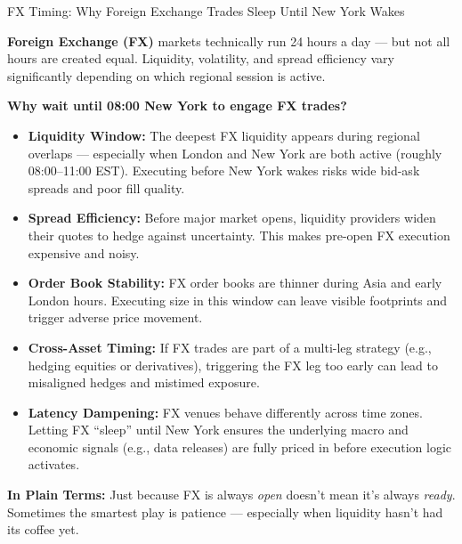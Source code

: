 \medskip
\begin{TechnicalSidebar}{FX Timing: Why Foreign Exchange Trades Sleep Until New York Wakes}

    \textbf{Foreign Exchange (FX)} markets technically run 24 hours a day — but not all hours are created equal.  
    Liquidity, volatility, and spread efficiency vary significantly depending on which regional session is active.
    
    \medskip
    
    \textbf{Why wait until 08:00 New York to engage FX trades?}

    \medskip
    
    \begin{itemize}
      \item \textbf{Liquidity Window:}  
      The deepest FX liquidity appears during regional overlaps — especially when London and New York are both active (roughly 08:00–11:00 EST).  
      Executing before New York wakes risks wide bid-ask spreads and poor fill quality.
    
      \item \textbf{Spread Efficiency:}  
      Before major market opens, liquidity providers widen their quotes to hedge against uncertainty.  
      This makes pre-open FX execution expensive and noisy.
    
      \item \textbf{Order Book Stability:}  
      FX order books are thinner during Asia and early London hours.  
      Executing size in this window can leave visible footprints and trigger adverse price movement.
    
      \item \textbf{Cross-Asset Timing:}  
      If FX trades are part of a multi-leg strategy (e.g., hedging equities or derivatives), triggering the FX leg too early can lead to misaligned hedges and mistimed exposure.
    
      \item \textbf{Latency Dampening:}  
      FX venues behave differently across time zones.  
      Letting FX “sleep” until New York ensures the underlying macro and economic signals (e.g., data releases) are fully priced in before execution logic activates.
    \end{itemize}
    
    \medskip
    
    \textbf{In Plain Terms:}  
    Just because FX is always \textit{open} doesn’t mean it’s always \textit{ready}.  
    Sometimes the smartest play is patience — especially when liquidity hasn’t had its coffee yet.
    
\end{TechnicalSidebar}

